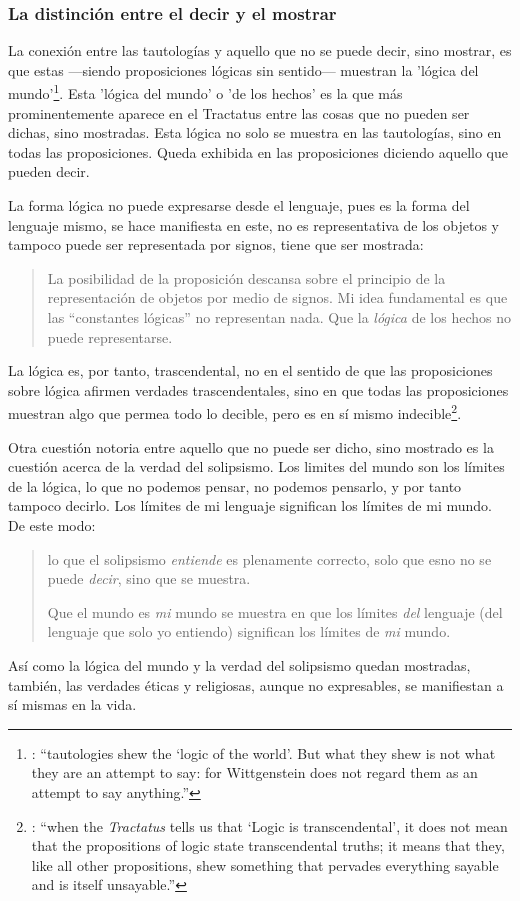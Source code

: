 \subsubsection{La distinción entre el decir y el mostrar}

La conexión entre las tautologías y aquello que no se puede decir, sino mostrar, es que estas ---siendo proposiciones lógicas sin sentido--- muestran la 'lógica del mundo'\footnote{\cite[Cf.~][163]{anscombe1959iwt}: \enquote{tautologies shew the `logic of the world'. But what they shew is not what they are an attempt to say: for Wittgenstein does not regard them as an attempt to say anything.}}. Esta 'lógica del mundo' o 'de los hechos' es la que más prominentemente aparece en el Tractatus entre las cosas que no pueden ser dichas, sino mostradas. Esta lógica no solo se muestra en las tautologías, sino en todas las proposiciones. Queda exhibida en las proposiciones diciendo aquello que pueden decir.

La forma lógica no puede expresarse desde el lenguaje, pues es la forma del lenguaje mismo, se hace manifiesta en este, no es representativa de los objetos y tampoco puede ser representada por signos, tiene que ser mostrada: \blockquote[{\cite[\S4.0312]{wittgenstein1922tractatuses}}]{La posibilidad de la proposición descansa sobre el principio de la representación de objetos por medio de signos. Mi idea fundamental es que las \enquote{constantes lógicas} no representan nada. Que la \emph{lógica} de los hechos no puede representarse.}

La lógica es, por tanto, trascendental, no en el sentido de que las proposiciones sobre lógica afirmen verdades trascendentales, sino en que todas las proposiciones muestran algo que permea todo lo decible, pero es en sí mismo indecible\footnote{\cite[Cf.~][166 \S2]{anscombe1959iwt}: \enquote{when the \emph{Tractatus} tells us that `Logic is transcendental', it does not mean that the propositions of logic state transcendental truths; it means that they, like all other propositions, shew something that pervades everything sayable and is itself unsayable.}}.

Otra cuestión notoria entre aquello que no puede ser dicho, sino mostrado es la cuestión acerca de la verdad del solipsismo. Los limites del mundo son los límites de la lógica, lo que no podemos pensar, no podemos pensarlo, y por tanto tampoco decirlo. Los límites de mi lenguaje significan los límites de mi mundo.\autocite[Cf~.][\S5.6 y \S5.61]{wittgenstein1922tractatuses} De este modo: \blockquote[{\cite[\S5.62]{wittgenstein1922tractatuses}}]{lo que el solipsismo \emph{entiende} es plenamente correcto, solo que esno no se puede \emph{decir}, sino que se muestra.

Que el mundo es \emph{mi} mundo se muestra en que los límites \emph{del} lenguaje (del lenguaje que solo yo entiendo) significan los límites de \emph{mi} mundo.} Así como la lógica del mundo y la verdad del solipsismo quedan mostradas, también, las verdades éticas y religiosas, aunque no expresables, se manifiestan a sí mismas en la vida.

